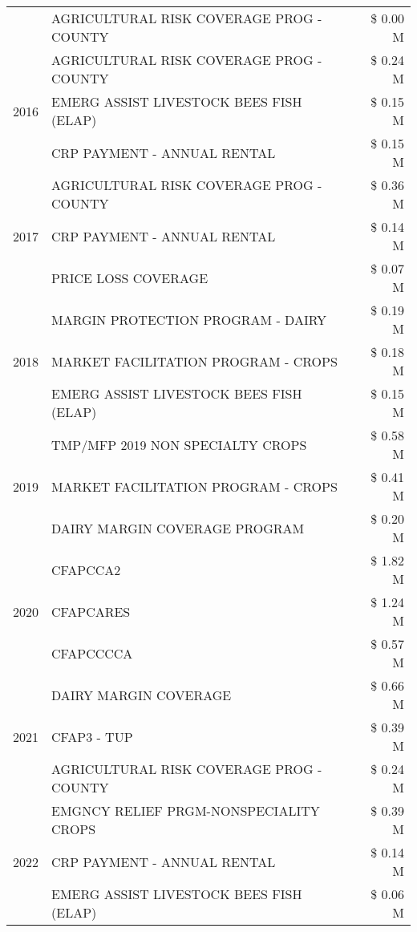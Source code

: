 \begin{tabular}{llr}
 & AGRICULTURAL RISK COVERAGE PROG - COUNTY & \$ 0.00 M \\
\cline{1-3}
\multirow[t]{3}{*}{2016} & AGRICULTURAL RISK COVERAGE PROG - COUNTY & \$ 0.24 M \\
 & EMERG ASSIST LIVESTOCK BEES FISH (ELAP) & \$ 0.15 M \\
 & CRP PAYMENT - ANNUAL RENTAL & \$ 0.15 M \\
\cline{1-3}
\multirow[t]{3}{*}{2017} & AGRICULTURAL RISK COVERAGE PROG - COUNTY & \$ 0.36 M \\
 & CRP PAYMENT - ANNUAL RENTAL & \$ 0.14 M \\
 & PRICE LOSS COVERAGE & \$ 0.07 M \\
\cline{1-3}
\multirow[t]{3}{*}{2018} & MARGIN PROTECTION PROGRAM - DAIRY & \$ 0.19 M \\
 & MARKET FACILITATION PROGRAM - CROPS & \$ 0.18 M \\
 & EMERG ASSIST LIVESTOCK BEES FISH (ELAP) & \$ 0.15 M \\
\cline{1-3}
\multirow[t]{3}{*}{2019} & TMP/MFP 2019 NON SPECIALTY CROPS & \$ 0.58 M \\
 & MARKET FACILITATION PROGRAM - CROPS & \$ 0.41 M \\
 & DAIRY MARGIN COVERAGE PROGRAM & \$ 0.20 M \\
\cline{1-3}
\multirow[t]{3}{*}{2020} & CFAPCCA2 & \$ 1.82 M \\
 & CFAPCARES & \$ 1.24 M \\
 & CFAPCCCCA & \$ 0.57 M \\
\cline{1-3}
\multirow[t]{3}{*}{2021} & DAIRY MARGIN COVERAGE & \$ 0.66 M \\
 & CFAP3 - TUP & \$ 0.39 M \\
 & AGRICULTURAL RISK COVERAGE PROG - COUNTY & \$ 0.24 M \\
\cline{1-3}
\multirow[t]{3}{*}{2022} & EMGNCY RELIEF PRGM-NONSPECIALITY CROPS & \$ 0.39 M \\
 & CRP PAYMENT - ANNUAL RENTAL & \$ 0.14 M \\
 & EMERG ASSIST LIVESTOCK BEES FISH (ELAP) & \$ 0.06 M \\
\cline{1-3}
\bottomrule
\end{tabular}
